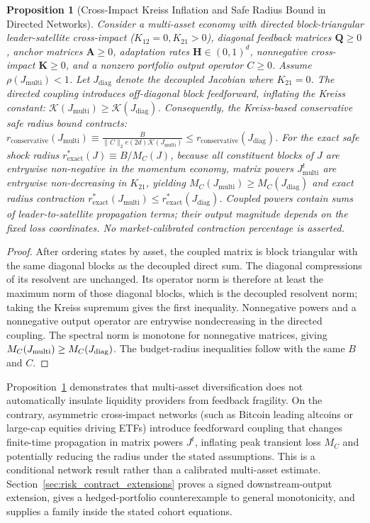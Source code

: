 \documentclass[12pt]{article}
\newtheorem{proposition}[theorem]{Proposition}
\theoremstyle{definition}
\theoremstyle{remark}
\begin{document}
\begin{proposition}[Cross-Impact Kreiss Inflation and Safe Radius Bound in Directed Networks]
\label{prop:cross_kreiss}
Consider a multi-asset economy with directed block-triangular leader-satellite cross-impact ($K_{12} = 0, K_{21} > 0$), diagonal feedback matrices $\mathbf{Q} \ge 0$, anchor matrices $\mathbf{A} \ge 0$, adaptation rates $\mathbf{H} \in (0, 1)^d$, nonnegative cross-impact $\mathbf K\ge0$, and a nonzero portfolio output operator $C\ge0$. Assume $\rho(J_{\text{multi}})<1$. Let $J_{\text{diag}}$ denote the decoupled Jacobian where $K_{21} = 0$.
The directed coupling introduces off-diagonal block feedforward, inflating the Kreiss constant: $\mathcal{K}(J_{\text{multi}}) \ge \mathcal{K}(J_{\text{diag}})$. Consequently, the Kreiss-based conservative safe radius bound contracts: $r_{\text{conservative}}(J_{\text{multi}}) \equiv \frac{B}{\|C\|_2 e (2d)\mathcal{K}(J_{\text{multi}})} \le r_{\text{conservative}}(J_{\text{diag}})$.
For the exact safe shock radius $r^*_{\text{exact}}(J) \equiv B / M_C(J)$, because all constituent blocks of $J$ are entrywise non-negative in the momentum economy, matrix powers $J_{\text{multi}}^t$ are entrywise non-decreasing in $K_{21}$, yielding $M_C(J_{\text{multi}}) \ge M_C(J_{\text{diag}})$ and exact radius contraction $r^*_{\text{exact}}(J_{\text{multi}}) \le r^*_{\text{exact}}(J_{\text{diag}})$. Coupled powers contain sums of leader-to-satellite propagation terms; their output magnitude depends on the fixed loss coordinates. No market-calibrated contraction percentage is asserted.
\end{proposition}
\begin{proof}
After ordering states by asset, the coupled matrix is block triangular with the same diagonal blocks as the decoupled direct sum. The diagonal compressions of its resolvent are unchanged. Its operator norm is therefore at least the maximum norm of those diagonal blocks, which is the decoupled resolvent norm; taking the Kreiss supremum gives the first inequality. Nonnegative powers and a nonnegative output operator are entrywise nondecreasing in the directed coupling. The spectral norm is monotone for nonnegative matrices, giving $M_C(J_{\rm multi})\ge M_C(J_{\rm diag})$. The budget-radius inequalities follow with the same $B$ and $C$.
\end{proof}

Proposition~\ref{prop:cross_kreiss} demonstrates that multi-asset diversification does not automatically insulate liquidity providers from feedback fragility. On the contrary, asymmetric cross-impact networks (such as Bitcoin leading altcoins or large-cap equities driving ETFs) introduce feedforward coupling that changes finite-time propagation in matrix powers $J^t$, inflating peak transient loss $M_C$ and potentially reducing the radius under the stated assumptions. This is a conditional network result rather than a calibrated multi-asset estimate. Section~\ref{sec:risk_contract_extensions} proves a signed downstream-output extension, gives a hedged-portfolio counterexample to general monotonicity, and supplies a family inside the stated cohort equations.
\end{document}
